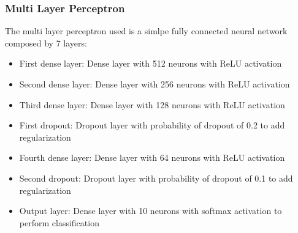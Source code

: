 \documentclass[12pt,journal,compsoc]{IEEEtran}
\begin{document}
\subsubsection{Multi Layer Perceptron}
The multi layer perceptron used is a simlpe fully connected neural network composed by 7 layers:
\begin{itemize}
	\item First dense layer: Dense layer with 512 neurons with ReLU activation
	\item Second dense layer: Dense layer with 256 neurons with ReLU activation
	\item Third dense layer: Dense layer with 128 neurons with ReLU activation
	\item First dropout: Dropout layer with probability of dropout of 0.2 to add regularization
	\item Fourth dense layer: Dense layer with 64 neurons with ReLU activation
	\item Second dropout: Dropout layer with probability of dropout of 0.1 to add regularization
	\item Output layer: Dense layer with 10 neurons with softmax activation to perform classification
\end{itemize}
\end{document}
